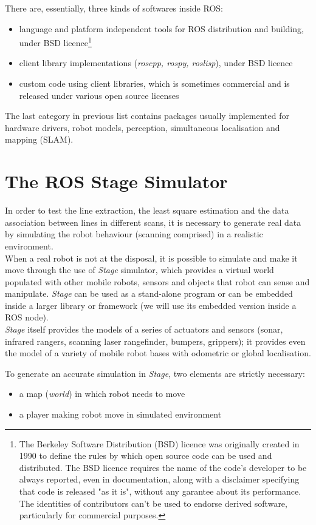 \documentclass[a4paper, onecolumn]{report}
\begin{document}
There are, essentially, three kinds of softwares inside ROS:
\begin{itemize}
	\item{language and platform independent tools for ROS distribution and building, under BSD licence\footnote{The Berkeley Software Distribution (BSD) licence was originally created in 1990 to define the rules by which open source code can be used and distributed. The BSD licence requires the name of the code's developer to be always reported, even in documentation, along with a disclaimer specifying that code is released "as it is", without any garantee about its performance. The identities of contributors can't be used to endorse derived software, particularly for commercial purposes.}}
	\item{client library implementations (\emph{roscpp, rospy, roslisp}), under BSD licence}
	\item{custom code using client libraries, which is sometimes commercial and is released under various open source licenses}
\end{itemize}
The last category in previous list contains packages usually implemented for hardware drivers, robot models, perception, simultaneous localisation and mapping (SLAM).

\section{The ROS Stage Simulator}
In order to test the line extraction, the least square estimation and the data association between lines in different scans, it is necessary to generate real data by simulating the robot behaviour (scanning comprised) in a realistic environment. \\
When a real robot is not at the disposal, it is possible to simulate and make it move through the use of \emph{Stage} simulator, which provides a virtual world populated with other mobile robots, sensors and objects that robot can sense and manipulate. \emph{Stage} can be used as a stand-alone program or can be embedded inside a larger library or framework (we will use its embedded version inside a ROS node).\\
\emph{Stage} itself provides the models of a series of actuators and sensors (sonar, infrared rangers, scanning laser rangefinder, bumpers, grippers); it provides even the model of a variety of mobile robot bases with odometric or global localisation. 

To generate an accurate simulation in \emph{Stage}, two elements are strictly necessary:
\begin{itemize}
	\item{a map (\emph{world}) in which robot needs to move}
	\item{a player making robot move in simulated environment}
\end{itemize}
\end{document}
